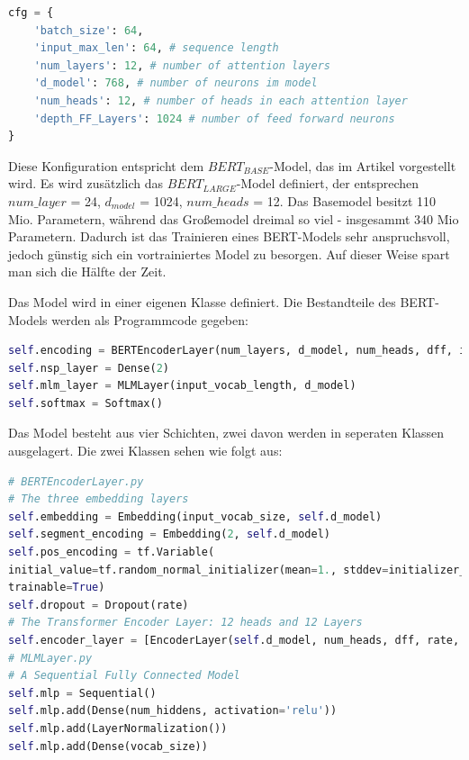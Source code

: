 \begin{lstlisting}[language=Python,caption={Die Hyperparametern vom BERT}] 
cfg = {
	'batch_size': 64,
	'input_max_len': 64, # sequence length
	'num_layers': 12, # number of attention layers
	'd_model': 768,	# number of neurons im model
	'num_heads': 12, # number of heads in each attention layer
	'depth_FF_Layers': 1024 # number of feed forward neurons
}
\end{lstlisting}

Diese Konfiguration entspricht dem $BERT_{BASE}$-Model, das im Artikel \cite{BERT:19} vorgestellt wird. Es wird zusätzlich das $BERT_{LARGE}$-Model definiert, der entsprechen $num\_layer$ = 24,  $d_{model}$ = 1024, $num\_heads$ = 12. Das Basemodel besitzt 110 Mio. Parametern, während das Großemodel dreimal so viel - insgesammt 340 Mio Parametern. Dadurch ist das Trainieren eines BERT-Models sehr anspruchsvoll, jedoch günstig sich ein vortrainiertes Model zu besorgen. Auf dieser Weise spart man sich die Hälfte der Zeit. 

Das Model wird in einer eigenen Klasse definiert. Die Bestandteile des BERT-Models werden als Programmcode gegeben:

\begin{lstlisting}[language=Python, caption={BERT-Struktur bei Pre-Training}]
self.encoding = BERTEncoderLayer(num_layers, d_model, num_heads, dff, input_vocab_length, maximum_positional_encoding, rate=rate, layer_norm_eps=layer_norm_eps)
self.nsp_layer = Dense(2)
self.mlm_layer = MLMLayer(input_vocab_length, d_model)
self.softmax = Softmax()
\end{lstlisting}

Das Model besteht aus vier Schichten, zwei davon werden in seperaten Klassen ausgelagert. Die zwei Klassen sehen wie folgt aus:

\begin{lstlisting}[language=Python, caption={Definition des BERT-Encoder-Layers}]
# BERTEncoderLayer.py
# The three embedding layers
self.embedding = Embedding(input_vocab_size, self.d_model)
self.segment_encoding = Embedding(2, self.d_model)
self.pos_encoding = tf.Variable(
initial_value=tf.random_normal_initializer(mean=1., stddev=initializer_range)(shape=[1, maximum_position_encoding, d_model]),
trainable=True)
self.dropout = Dropout(rate)
# The Transformer Encoder Layer: 12 heads and 12 Layers
self.encoder_layer = [EncoderLayer(self.d_model, num_heads, dff, rate, layer_norm_eps) for _ in range(self.num_layers)]
# MLMLayer.py
# A Sequential Fully Connected Model
self.mlp = Sequential()
self.mlp.add(Dense(num_hiddens, activation='relu'))
self.mlp.add(LayerNormalization())
self.mlp.add(Dense(vocab_size))
\end{lstlisting}

